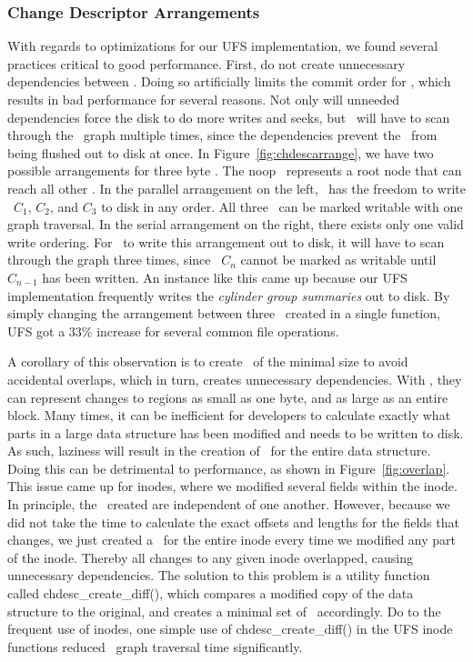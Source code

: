 \subsubsection {Change Descriptor Arrangements}
With regards to optimizations for our UFS implementation, we found several
practices critical to good performance. First, do not create unnecessary
dependencies between \chdescs. Doing so artificially limits the commit order
for \chdescs, which results in bad performance for several reasons. Not only
will unneeded dependencies force the disk to do more writes and seeks, but
\Kudos\ will have to scan through the \chdesc\ graph multiple times, since the
dependencies prevent the \chdescs\ from being flushed out to disk at once.
In Figure~\ref{fig:chdescarrange}, we have two possible arrangements for three
byte \chdescs. The noop \chdesc\ represents a root node that can reach all
other \chdescs. In the parallel arrangement on the left, \Kudos\ has the
freedom to write \chdescs\ $C_1$, $C_2$, and $C_3$ to disk in any order. All
three \chdescs\ can be marked writable with one graph traversal. In the serial
arrangement on the right, there exists only one valid write ordering. For
\Kudos\ to write this arrangement out to disk, it will have to scan through
the graph three times, since \chdesc\ $C_n$ cannot be marked as writable until
$C_{n-1}$ has been written.
An instance like this came up because our UFS implementation frequently writes
the \emph{cylinder group summaries} out to disk. By simply changing the
arrangement between three \chdescs\ created in a single function, UFS got a
33\% increase for several common file operations.

A corollary of this observation is to create \chdescs\ of the minimal size
to avoid accidental overlaps, which in turn, creates unnecessary dependencies.
With \chdescs, they can represent changes to regions as small as one byte, and
as large as an entire block. Many times, it can be inefficient for developers
to calculate exactly what parts in a large data structure has been modified and
needs to be written to disk. As such, laziness will result in the creation of
\chdescs\ for the entire data structure. Doing this can be detrimental to
performance, as shown in Figure~\ref{fig:overlap}. This issue came up for
inodes, where we modified several fields within the inode. In principle, the
\chdescs\ created are independent of one another. However, because we did not
take the time to calculate the exact offsets and lengths for the fields that
changes, we just created a \chdesc\ for the entire inode every time we modified
any part of the inode. Thereby all changes to any given inode overlapped,
causing unnecessary dependencies. The solution to this problem is a utility
function called chdesc\_create\_diff(), which compares a modified copy of the
data structure to the original, and creates a minimal set of \chdescs\ 
accordingly. Do to the frequent use of inodes, one simple use of
chdesc\_create\_diff() in the UFS inode functions reduced \chdescs\ graph
traversal time significantly.

